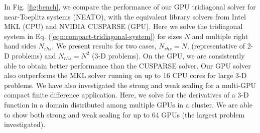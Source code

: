 \documentclass[letterpaper,10pt]{article}
\begin{document}
\fi
%
In Fig. \ref{fig:bench},
we compare the performance of our GPU tridiagonal solver
for near-Toeplitz systems (NEATO),
with the equivalent library solvers from
Intel MKL (CPU) and NVIDIA CUSPARSE (GPU).
Here we solve the tridiagonal system in
Eq. (\ref{eqn:compact-tridiagonal-system})
for sizes $N$ and multiple right hand sides $N_{rhs}$.
We present results for two cases, $N_{rhs}=N$,
(representative of 2-D problems)
and $N_{rhs}=N^2$ (3-D problems).
On the GPU, we are consistently able to
obtain better performance than the CUSPARSE solver.
Our GPU solver also outperforms the MKL solver
running on up to 16 CPU cores for large 3-D problems.
We have also investigated the strong and weak scaling for a
multi-GPU compact finite difference application.
Here, we solve for the derivatives of a 3-D function
in a domain distributed among multiple GPUs in a cluster.
We are able to show both strong and weak scaling for up to 64 GPUs
(the largest problem investigated).



\end{document}
